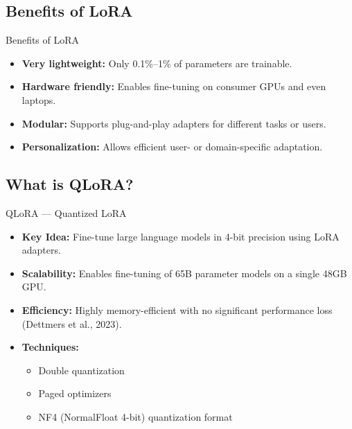\subsection{Benefits of LoRA}
\begin{frame}{Benefits of LoRA}
    \begin{itemize}
        \item \textbf{Very lightweight:} Only 0.1\%--1\% of parameters are trainable.
        \item \textbf{Hardware friendly:} Enables fine-tuning on consumer GPUs and even laptops.
        \item \textbf{Modular:} Supports plug-and-play adapters for different tasks or users.
        \item \textbf{Personalization:} Allows efficient user- or domain-specific adaptation.
    \end{itemize}
\end{frame}


\subsection{What is QLoRA?}
\begin{frame}{QLoRA — Quantized LoRA}
    \begin{itemize}
        \item \textbf{Key Idea:} Fine-tune large language models in 4-bit precision using LoRA adapters.
        \item \textbf{Scalability:} Enables fine-tuning of 65B parameter models on a single 48GB GPU.
        \item \textbf{Efficiency:} Highly memory-efficient with no significant performance loss (Dettmers et al., 2023).
        \item \textbf{Techniques:}
        \begin{itemize}
            \item Double quantization
            \item Paged optimizers
            \item NF4 (NormalFloat 4-bit) quantization format
        \end{itemize}
    \end{itemize}
\end{frame}


